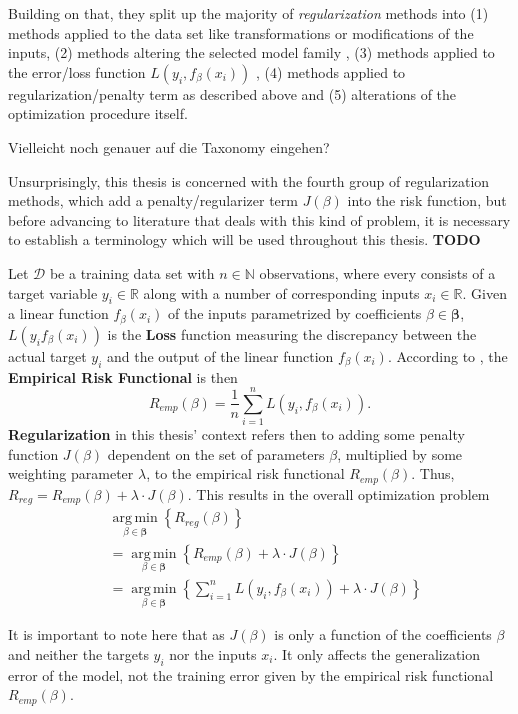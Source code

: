 \documentclass[12pt,a4paper]{article}
\newenvironment{lightbluebox}{%
    \begin{tcolorbox}[colback=lightblue, colframe=lightblue, fontupper=\itshape]%
}{%
    \end{tcolorbox}%
}
\DeclareMathOperator*{\argmin}{arg\,min}
\begin{document}
Building on that, they split up the majority of \textit{regularization} methods into  (1) methods applied to the data set like transformations or modifications of the inputs, (2) methods altering the selected model family , (3) methods applied to the error/loss function $L(y_i, f_\beta(x_i))$ , (4) methods applied to regularization/penalty term as described above and (5) alterations of the optimization procedure itself. 

\begin{lightbluebox}
Vielleicht noch genauer auf die Taxonomy eingehen? 
\end{lightbluebox} 

Unsurprisingly, this thesis is concerned with the fourth group of regularization methods, which add a penalty/regularizer term $J(\beta)$ into the risk function, but before advancing to literature that deals with this kind of problem, it is necessary to establish a terminology which will be used throughout this thesis. \textbf{TODO}

Let $\mathcal{D}$ be a training data set with $n \in \mathbb{N}$ observations, where every  consists of a target variable $y_i \in \mathbb{R}$ along with a number of corresponding inputs $x_i \in \mathbb{R}$. Given a linear function $f_\beta(x_i)$ of the inputs parametrized by coefficients $\beta \in \boldsymbol{\beta}$, $L(y_i f_\beta(x_i))$ is the \textbf{Loss} function measuring the discrepancy between the actual target $y_i$ and the output of the linear function $f_\beta(x_i)$. According to \textcite{Vapnik1991}, the \textbf{Empirical Risk Functional} is then 
\[
R_{emp}(\beta) = \frac{1}{n} \sum_{i=1}^n L(y_i, f_\beta(x_i)).
\]
\textbf{Regularization} in this thesis' context refers then to adding some penalty function $J(\beta)$ dependent on the set of parameters $\beta$, multiplied by some weighting parameter $\lambda$, to the empirical risk functional $R_{emp}(\beta)$. Thus, $R_{reg} = R_{emp}(\beta) + \lambda\cdot J(\beta)$. This results in the overall optimization problem
\begin{align*}
&\underset{\beta \in \boldsymbol{\beta}}{\argmin}\left\{R_{reg}(\beta)\right\}\\
&=\underset{\beta \in \boldsymbol{\beta}}{\argmin}\left\{R_{emp}(\beta) + \lambda\cdot J(\beta)\right\}\\
&=\underset{\beta \in \boldsymbol{\beta}}{\argmin}\left\{\sum_{i=1}^n L(y_i, f_\beta(x_i)) + \lambda\cdot J(\beta)\right\}
\end{align*}

It is important to note here that as $J(\beta)$ is only a function of the coefficients $\beta$ and neither the targets $y_i$ nor the inputs $x_i$. It only affects the generalization error of the model, not the training error given by the empirical risk functional $R_{emp}(\beta)$.
\end{document}
